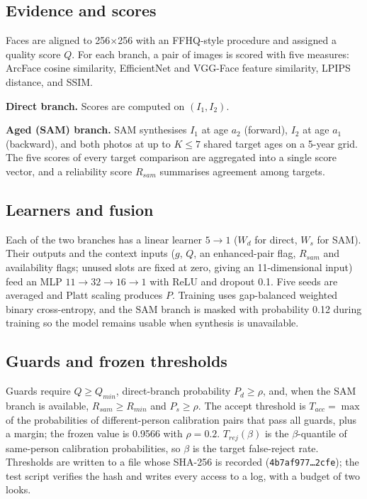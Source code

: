 \documentclass[10pt,twocolumn]{article}
\begin{document}
\subsection{Evidence and scores}
Faces are aligned to 256$\times$256 with an FFHQ-style procedure and assigned a quality score $Q$. For each branch, a pair of images is scored with five measures: ArcFace cosine similarity, EfficientNet and VGG-Face feature similarity, LPIPS distance, and SSIM.

\textbf{Direct branch.} Scores are computed on $(I_1,I_2)$.

\textbf{Aged (SAM) branch.} SAM synthesises $I_1$ at age $a_2$ (forward), $I_2$ at age $a_1$ (backward), and both photos at up to $K\le7$ shared target ages on a 5-year grid. The five scores of every target comparison are aggregated into a single score vector, and a reliability score $R_{sam}$ summarises agreement among targets.

\subsection{Learners and fusion}
Each of the two branches has a linear learner $5\to1$ ($W_d$ for direct, $W_s$ for SAM). Their outputs and the context inputs ($g$, $Q$, an enhanced-pair flag, $R_{sam}$ and availability flags; unused slots are fixed at zero, giving an 11-dimensional input) feed an MLP $11\to32\to16\to1$ with ReLU and dropout 0.1. Five seeds are averaged and Platt scaling produces $P$. Training uses gap-balanced weighted binary cross-entropy, and the SAM branch is masked with probability 0.12 during training so the model remains usable when synthesis is unavailable.

\subsection{Guards and frozen thresholds}
Guards require $Q\ge Q_{min}$, direct-branch probability $P_d\ge\rho$, and, when the SAM branch is available, $R_{sam}\ge R_{min}$ and $P_s\ge\rho$. The accept threshold is $T_{acc}=\max$ of the probabilities of different-person calibration pairs that pass all guards, plus a margin; the frozen value is 0.9566 with $\rho=0.2$. $T_{rej}(\beta)$ is the $\beta$-quantile of same-person calibration probabilities, so $\beta$ is the target false-reject rate. Thresholds are written to a file whose SHA-256 is recorded (\texttt{4b7af977\ldots2cfe}); the test script verifies the hash and writes every access to a log, with a budget of two looks.
\end{document}
